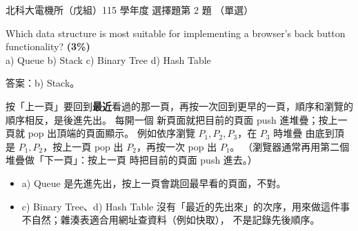 \begin{pastexam}[label={px:ntut-115-ee-ds-12}]{北科大電機所（戊組）115 學年度 選擇題第 2 題}
（單選）

Which data structure is most suitable for implementing a browser's back button functionality?
\textbf{(3\%)}\\
a) Queue \qquad b) Stack \qquad c) Binary Tree \qquad d) Hash Table
\end{pastexam}

\begin{pastsoln}
答案：b) Stack。

按「上一頁」要回到\textbf{最近}看過的那一頁，再按一次回到更早的一頁，順序和瀏覽的順序相反，是後進先出。 每開一個
新頁面就把目前的頁面 push 進堆疊；按上一頁就 pop 出頂端的頁面顯示。 例如依序瀏覽 $P_1, P_2, P_3$，在 $P_3$ 時堆疊
由底到頂是 $P_1, P_2$，按上一頁 pop 出 $P_2$，再按一次 pop 出 $P_1$。 （瀏覽器通常再用第二個堆疊做「下一頁」：按上一頁
時把目前的頁面 push 進去。）
\begin{itemize}
\item a) Queue 是先進先出，按上一頁會跳回最早看的頁面，不對。
\item c) Binary Tree、d) Hash Table 沒有「最近的先出來」的次序，用來做這件事不自然；雜湊表適合用網址查資料（例如快取），
不是記錄先後順序。
\end{itemize}
\end{pastsoln}

